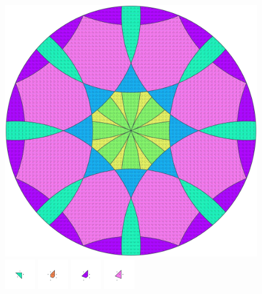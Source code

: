 \documentclass[text.tex]{subfiles}
\begin{document}
\clearpage
\pagestyle{fancy}
\fancyhf{}
\begin{figure}[h!]
\centering
\includegraphics[width=1\textwidth]{img/results/circle8/circle8_184776_(-312_130alpha_1).pdf}
\includegraphics[width=0.12\textwidth]{img/results/circle8/circle8_184776_(-312_130alpha_1)_001.pdf}
\includegraphics[width=0.12\textwidth]{img/results/circle8/circle8_184776_(-312_130alpha_1)_002.pdf}
\includegraphics[width=0.12\textwidth]{img/results/circle8/circle8_184776_(-312_130alpha_1)_003.pdf}
\includegraphics[width=0.12\textwidth]{img/results/circle8/circle8_184776_(-312_130alpha_1)_004.pdf}

\end{figure}
\end{document}
